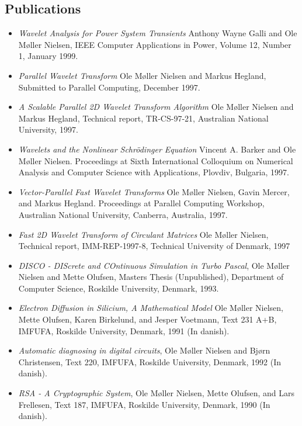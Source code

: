 \documentclass[12pt,a4paper]{article}
\begin{document}
\subsection*{Publications}

\begin{itemize}
\item  {\it Wavelet Analysis for Power System Transients} Anthony Wayne Galli 
and Ole M{\o }ller Nielsen, IEEE Computer Applications in Power, Volume 12, Number 1, January 1999.

\item  {\it Parallel Wavelet Transform} Ole M{\o }ller Nielsen and Markus
Hegland, Submitted to Parallel Computing, December 1997.

\item  {\it A Scalable Parallel 2D Wavelet Transform Algorithm} 
Ole M{\o }ller Nielsen and Markus Hegland, Technical report, TR-CS-97-21, 
Australian National University, 1997.

\item {\it Wavelets and the Nonlinear Schr{\"o}dinger Equation} 
Vincent A. Barker and Ole M{\o}ller Nielsen.
Proceedings at Sixth International Colloquium on Numerical Analysis and Computer Science with Applications,
Plovdiv, Bulgaria, 1997.

\item  {\it Vector-Parallel Fast Wavelet Transforms} Ole M{\o }ller Nielsen,
Gavin Mercer, and Markus Hegland. Proceedings at Parallel Computing Workshop,
Australian National University, Canberra, Australia, 1997.

\item  {\it Fast {2D} Wavelet Transform of Circulant Matrices} 
Ole M{\o }ller Nielsen, Technical report, IMM-REP-1997-8, Technical University of Denmark, 1997

\item  {\it DISCO - DIScrete and COntinuous Simulation in Turbo Pascal}, Ole
M{\o }ller Nielsen and Mette Olufsen, Masters Thesis (Unpublished),
Department of Computer Science, Roskilde University, Denmark, 1993.

\item  {\it Electron Diffusion in Silicium, A Mathematical Model} Ole M{\o}ller Nielsen, Mette Olufsen, Karen Birkelund, and
Jesper Voetmann, Text 231 A+B, IMFUFA, Roskilde University, Denmark, 1991
(In danish).

\item  {\it Automatic diagnosing in digital circuits}, Ole M{\o}ller Nielsen and Bj{\o }rn Christensen, Text 220, IMFUFA,
Roskilde University, Denmark, 1992 (In danish).

\item  {\it RSA - A Cryptographic System}, 
Ole M{\o}ller Nielsen, Mette Olufsen, and Lars Frellesen, Text 187, IMFUFA,
Roskilde University, Denmark, 1990 (In danish).
\end{itemize}
\end{document}
